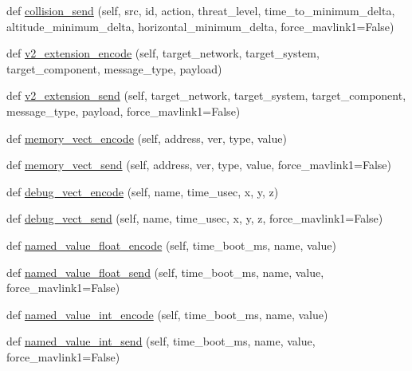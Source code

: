 \begin{DoxyCompactItemize}
\item 
def \hyperlink{classpymavlink_1_1dialects_1_1v10_1_1MAVLink_ac8e6be8cd69b0e258e58479ee58ec6eb}{collision\+\_\+send} (self, src, id, action, threat\+\_\+level, time\+\_\+to\+\_\+minimum\+\_\+delta, altitude\+\_\+minimum\+\_\+delta, horizontal\+\_\+minimum\+\_\+delta, force\+\_\+mavlink1=False)
\item 
def \hyperlink{classpymavlink_1_1dialects_1_1v10_1_1MAVLink_acccefc2e8c26c293e6ad99bfaa77f105}{v2\+\_\+extension\+\_\+encode} (self, target\+\_\+network, target\+\_\+system, target\+\_\+component, message\+\_\+type, payload)
\item 
def \hyperlink{classpymavlink_1_1dialects_1_1v10_1_1MAVLink_aeab910bd83c888b86429d02eb853d54c}{v2\+\_\+extension\+\_\+send} (self, target\+\_\+network, target\+\_\+system, target\+\_\+component, message\+\_\+type, payload, force\+\_\+mavlink1=False)
\item 
def \hyperlink{classpymavlink_1_1dialects_1_1v10_1_1MAVLink_a741166ae277c38b82af972003eac3984}{memory\+\_\+vect\+\_\+encode} (self, address, ver, type, value)
\item 
def \hyperlink{classpymavlink_1_1dialects_1_1v10_1_1MAVLink_a2ae1e2033e0b4022ca5fe0fbb09c683e}{memory\+\_\+vect\+\_\+send} (self, address, ver, type, value, force\+\_\+mavlink1=False)
\item 
def \hyperlink{classpymavlink_1_1dialects_1_1v10_1_1MAVLink_a060dd2151e7ac5772147b545bf78bb88}{debug\+\_\+vect\+\_\+encode} (self, name, time\+\_\+usec, x, y, z)
\item 
def \hyperlink{classpymavlink_1_1dialects_1_1v10_1_1MAVLink_acaab403312d246bfc0b662bd908ef6b2}{debug\+\_\+vect\+\_\+send} (self, name, time\+\_\+usec, x, y, z, force\+\_\+mavlink1=False)
\item 
def \hyperlink{classpymavlink_1_1dialects_1_1v10_1_1MAVLink_a7cd1482ce96acb0b44f62ce7562df767}{named\+\_\+value\+\_\+float\+\_\+encode} (self, time\+\_\+boot\+\_\+ms, name, value)
\item 
def \hyperlink{classpymavlink_1_1dialects_1_1v10_1_1MAVLink_a58f80d13fb96a139cf1ae61f655efac5}{named\+\_\+value\+\_\+float\+\_\+send} (self, time\+\_\+boot\+\_\+ms, name, value, force\+\_\+mavlink1=False)
\item 
def \hyperlink{classpymavlink_1_1dialects_1_1v10_1_1MAVLink_aae5cba83e43546b602f6afece1f5f054}{named\+\_\+value\+\_\+int\+\_\+encode} (self, time\+\_\+boot\+\_\+ms, name, value)
\item 
def \hyperlink{classpymavlink_1_1dialects_1_1v10_1_1MAVLink_ad73c59270b095cd4694efaa806614947}{named\+\_\+value\+\_\+int\+\_\+send} (self, time\+\_\+boot\+\_\+ms, name, value, force\+\_\+mavlink1=False)

\end{DoxyCompactItemize}
